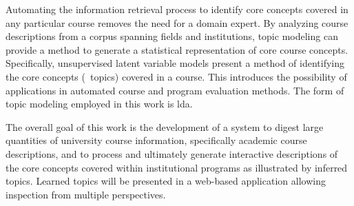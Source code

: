 
Automating the information retrieval process to identify core concepts covered in any particular course removes the need for a domain expert.
By analyzing course descriptions from a corpus spanning fields and institutions, topic modeling can provide a method to generate a statistical representation of core course concepts.
Specifically, unsupervised latent variable models present a method of identifying the core concepts (\ie\ topics) covered in a course.
This introduces the possibility of applications in automated course and program evaluation methods.
The form of topic modeling employed in this work is \acf{lda}.~\cite{Blei2003}


The overall goal of this work is the development of a system to digest large quantities of university course information, specifically academic course descriptions, and to process and ultimately generate interactive descriptions of the core concepts covered within institutional programs as illustrated by inferred topics.
Learned topics will be presented in a web-based application allowing inspection from multiple perspectives.


